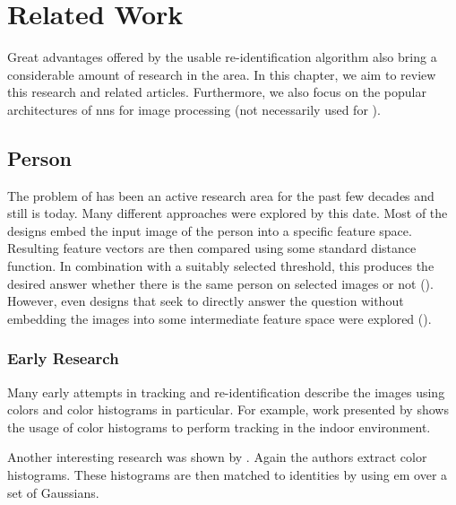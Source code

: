 \chapter{Related Work}


Great advantages offered by the usable re-identification algorithm also bring a considerable amount of research in the area. In this chapter, we aim to review this research and related articles. Furthermore, we also focus on the popular architectures of \glspl{nn} for image processing (not necessarily used for \reid{}).


\section{Person \Reid{}}

\label{sec:person_reid}

The problem of \reid{} has been an active research area for the past few decades and still is today. Many different approaches were explored by this date. Most of the designs embed the input image of the person into a specific feature space. Resulting feature vectors are then compared using some standard distance function. In combination with a suitably selected threshold, this produces the desired answer whether there is the same person on selected images or not (\cite{cheng2016person}). However, even designs that seek to directly answer the question without embedding the images into some intermediate feature space were explored (\cite{li2014deepreid}).

\subsection{Early Research}
\label{sec:early_research}

Many early attempts in tracking and re-identification describe the images using colors and color histograms in particular. For example, work presented by \cite{krumm2000multi} shows the usage of color histograms to perform tracking in the indoor environment.


Another interesting research was shown by \cite{orwell1999multi}. Again the authors extract color histograms. These histograms are then matched to identities by using \gls{em} over a set of Gaussians.

